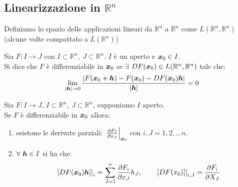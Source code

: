 \subsection{Linearizzazione in $\mathbb{R}^n$}%
\begin{defn}
    Definiamo lo spazio delle applicazioni lineari da $\mathbb{R}^n$ a $\mathbb{R}^n$ come $L(\mathbb{R}^n, \mathbb{R}^n)$ (alcune volte compattato a $L(\mathbb{R}^n)$) 
\end{defn}
\noindent
\begin{defn}
    Sia $F:I\to J$ con $I \subset \mathbb{R}^n, \ J \subset \mathbb{R}^n$. $I$ è un aperto e $\boldsymbol{x}_0 \in I$.\\
    Si dice che $F$ è differenziabile in $\boldsymbol{x}_0$ se $\exists$ $DF(\boldsymbol{x}_0) \in L(\mathbb{R}^n, \mathbb{R}^n)$ tale che:
    \[
	\lim_{\left|\boldsymbol{h}\right| \to 0} \frac{\left|F(\boldsymbol{x}_0+ \boldsymbol{h})-F(\boldsymbol{x}_0)-DF(\boldsymbol{x}_0) \boldsymbol{h}\right|}{\left|\boldsymbol{h}\right|} = 0
    \] 
\end{defn}
\noindent
\begin{thm}
    Sia $F:I\to J$, $I \subset \mathbb{R}^n, \ J \subset \mathbb{R}^n$, supponiamo $I$  aperto.\\
    Se $F$  è differenziabile in $\boldsymbol{x}_0$  allora:
    \begin{enumerate}
        \item esistono le derivate parziali: $\left.\frac{\partial F_I}{\partial x_J}\right|_{\boldsymbol{x}_0} $ con $i, J = 1, 2, \ldots n$. 
	    \item $\forall \ \boldsymbol{h}  \in I$ si ha che:
		\[
		    \left.\left[DF(\boldsymbol{x}_0) \boldsymbol{h}\right]\right|_{i} = 
			\sum_{J=1}^{n} \frac{\partial F_i}{\partial x_J} h_J, 
			\qquad \left.\left[DF(x_0)\right]\right|_{i, J} = \frac{\partial F_i}{\partial X_J} 
		\] 
    \end{enumerate}
\end{thm}
\noindent
